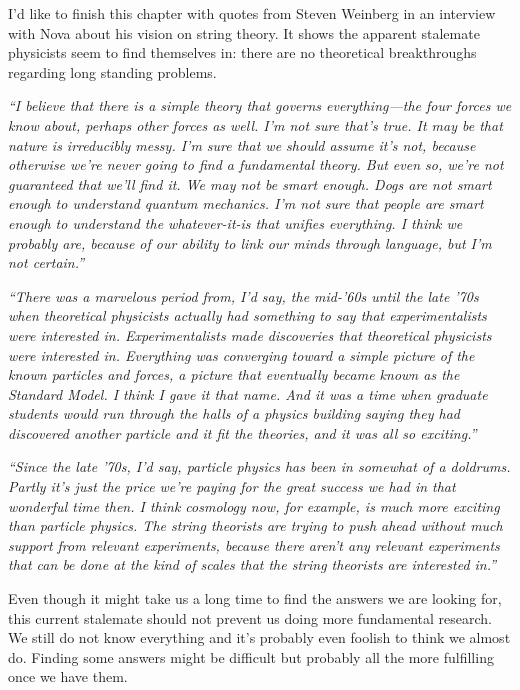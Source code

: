 \noindent I'd like to finish this chapter with quotes from Steven Weinberg in an interview with Nova about his vision on string theory. It shows the apparent stalemate physicists seem to find themselves in: there are no theoretical breakthroughs regarding long standing problems.

\begin{center}
\begin{minipage}[5cm]{0.9\textwidth}
\textit{``I believe that there is a simple theory that governs everything—the four forces we know about, perhaps other forces as well. I'm not sure that's true. It may be that nature is irreducibly messy. I'm sure that we should assume it's not, because otherwise we're never going to find a fundamental theory. But even so, we're not guaranteed that we'll find it. We may not be smart enough. Dogs are not smart enough to understand quantum mechanics. I'm not sure that people are smart enough to understand the whatever-it-is that unifies everything. I think we probably are, because of our ability to link our minds through language, but I'm not certain.''}
\end{minipage} 
\end{center}

\begin{center}
\begin{minipage}[5cm]{0.9\textwidth}
\textit{\noindent ``There was a marvelous period from, I'd say, the mid-'60s until the late '70s when theoretical physicists actually had something to say that experimentalists were interested in. Experimentalists made discoveries that theoretical physicists were interested in. Everything was converging toward a simple picture of the known particles and forces, a picture that eventually became known as the Standard Model. I think I gave it that name. And it was a time when graduate students would run through the halls of a physics building saying they had discovered another particle and it fit the theories, and it was all so exciting.''}
\end{minipage} 
\end{center}

\begin{center}
\begin{minipage}[5cm]{0.9\textwidth}
\textit{\noindent ``Since the late '70s, I'd say, particle physics has been in somewhat of a doldrums. Partly it's just the price we're paying for the great success we had in that wonderful time then. I think cosmology now, for example, is much more exciting than particle physics. The string theorists are trying to push ahead without much support from relevant experiments, because there aren't any relevant experiments that can be done at the kind of scales that the string theorists are interested in.''}
\end{minipage} 
\end{center}

\noindent Even though it might take us a long time to find the answers we are looking for, this current stalemate should not prevent us doing more fundamental research. We still do not know everything and it's probably even foolish to think we almost do. Finding some answers might be difficult but probably all the more fulfilling once we have them.